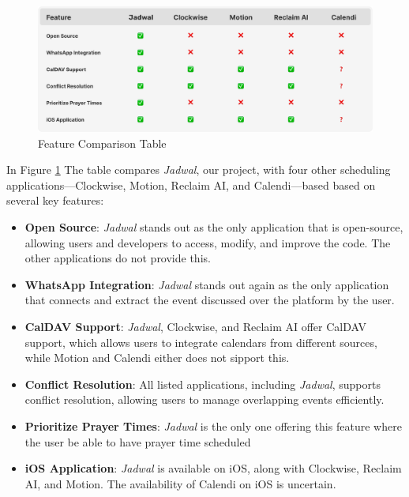 \documentclass[12pt,a4paper]{report}
\begin{document}
\begin{figure}[!h]
    \centering
    \includegraphics[width=\textwidth]{images/features-table.png}
    \caption{Feature Comparison Table}
    \label{fig:features-table}
    
\end{figure}

\newpage

In Figure \ref{fig:features-table} The table compares \textit{Jadwal}, our project, with four other scheduling applications—Clockwise, Motion, Reclaim AI, and Calendi—based based on several key features:
\begin{itemize}
    \item \textbf{Open Source}: \textit{Jadwal} stands out as the only application that is open-source, allowing users and developers to access, modify, and improve the code. The other applications do not provide this.
    \item \textbf{WhatsApp Integration}: \textit{Jadwal} stands out again as the only application that connects and extract the event discussed over the platform by the user.
    \item \textbf{CalDAV Support}: \textit{Jadwal}, Clockwise, and Reclaim AI offer CalDAV support, which allows users to integrate calendars from different sources, while Motion and Calendi either does not sipport this.
    \item \textbf{Conflict Resolution}: All listed applications, including \textit{Jadwal}, supports conflict resolution, allowing users to manage overlapping events efficiently.
    \item \textbf{Prioritize Prayer Times}: \textit{Jadwal} is the only one offering this feature where the user be able to have prayer time scheduled
    \item \textbf{iOS Application}: \textit{Jadwal} is available on iOS, along with Clockwise, Reclaim AI, and Motion. The availability of Calendi on iOS is uncertain.
\end{itemize}
\end{document}

